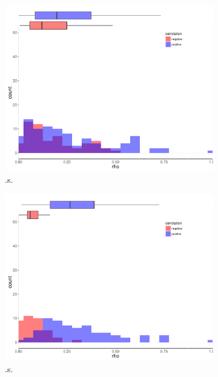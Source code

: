 \begin{figure}
\begin{subfigure}[b]{0.4\textwidth}
        \includegraphics[width = 1\textwidth]{figures/combinedplotTM_ds.pdf}
        \caption{.s.}
        \label{fig:.}
    \end{subfigure}
\begin{subfigure}[b]{0.4\textwidth}
        \includegraphics[width = 1\textwidth]{figures/combinedplotTM_ws.pdf}
        \caption{.s.}
        \label{fig:.}
    \end{subfigure}
\begin{subfigure}[b]{0.4\textwidth}

\end{subfigure}
\end{figure}
